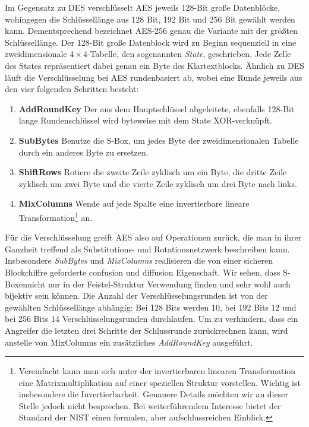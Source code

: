 Im Gegensatz zu DES verschlüsselt AES jeweils 128-Bit große Datenblöcke,
wohingegen die Schlüssellänge aus 128 Bit, 192 Bit und 256 Bit gewählt
werden kann. Dementsprechend bezeichnet AES-256 genau die Variante mit
der größten Schlüssellänge. Der 128-Bit große Datenblock wird zu Beginn
sequenziell in eine zweidimensionale $4 \times 4$-Tabelle, den
sogenannten \emph{State}, geschrieben. Jede Zelle des States
repräsentiert dabei genau ein Byte des Klartextblocks. Ähnlich zu DES
läuft die Verschlüsselung bei AES rundenbasiert ab, wobei eine Runde
jeweils aus den vier folgenden Schritten besteht:

\begin{enumerate}
  \small
\item \textbf{AddRoundKey} Der aus dem Hauptschlüssel abgeleitete,
  ebenfalls 128-Bit lange Rundenschlüssel wird byteweise mit dem State
  XOR-verknüpft. 
\item \textbf{SubBytes} Benutze die S-Box, um jedes Byte der
  zweidimensionalen Tabelle durch ein anderes Byte zu ersetzen. 
\item \textbf{ShiftRows} Rotiere die zweite Zeile zyklisch um ein Byte,
  die dritte Zeile zyklisch um zwei Byte und die vierte Zeile zyklisch
  um drei Byte nach links. 
\item \textbf{MixColumns} Wende auf jede Spalte eine invertierbare
  lineare Transformation\footnote{Vereinfacht kann man sich unter der
    invertierbaren linearen Transformation eine Matrixmultiplikation auf
    einer speziellen Struktur vorstellen. Wichtig ist insbesondere die
    Invertierbarkeit. Genauere Details möchten wir an dieser Stelle
    jedoch nicht besprechen. Bei weiterführendem Interesse bietet der
    Standard der NIST \cite{NIST_AES01} einen formalen, aber
    aufschlussreichen Einblick.} an. 
\end{enumerate}

Für die Verschlüsselung greift AES also auf Operationen zurück, die man
in ihrer Ganzheit treffend als Substitutions- und Rotationsnetzwerk
beschreiben kann. Insbesondere \textit{SubBytes} und \textit{MixColumns}
realisieren die von einer sicheren Blockchiffre geforderte confusion und
diffusion Eigenschaft. Wir sehen, dass S-Boxen\indexSBOX nicht nur in
der Feistel-Struktur Verwendung finden und sehr wohl auch bijektiv sein
können. 
Die Anzahl der Verschlüsselungsrunden ist von der gewählten
Schlüssellänge abhängig: Bei 128 Bits werden 10, bei 192 Bits 12 und bei
256 Bits 14 Verschlüsselungsrunden durchlaufen. Um zu verhindern, dass
ein Angreifer die letzten drei Schritte der Schlussrunde zurückrechnen
kann, wird anstelle von MixColumns ein zusätzliches \textit{AddRoundKey}
ausgeführt. 

